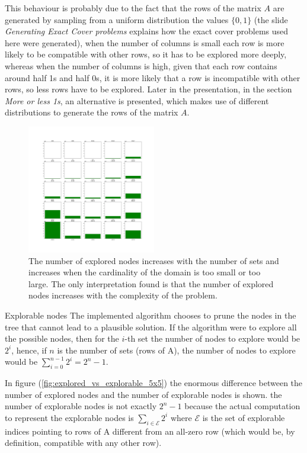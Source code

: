 \documentclass{beamer}
\begin{document}
\begin{frame}{}    
    This behaviour is probably due to the fact that the rows
    of the matrix $A$ are generated by sampling from a uniform distribution the values 
    $\{0, 1\}$ (the slide \textit{Generating Exact Cover problems} explains how 
    the exact cover problems used here were generated), when the number of columns is small each row is more likely to be 
    compatible with other rows, so it has to be explored more deeply, whereas when the 
    number of columns is high, given that each row contains around half 1s and half 0s,
    it is more likely that a row is incompatible with other rows, so less rows have to be 
    explored.
    Later in the presentation, in the section \textit{More or less 1s}, an alternative is presented,
    which makes use of different distributions to generate the rows of the matrix $A$.
\end{frame}

\begin{frame}
    \begin{figure}
        \centering
        \includegraphics[width=0.5\textwidth]{explored_5x5.pdf}
        \caption{The number of explored nodes increases with the number of sets and increases
        when the cardinality of the domain is too small or too large. The only interpretation
        found is that the number of explored nodes increases with the complexity of the problem.}
        \label{fig:explored_5x5}
    \end{figure}
\end{frame}

\begin{frame}{Explorable nodes}
    The implemented algorithm chooses to prune the nodes in the tree
    that cannot lead to a plausible solution.
    If the algorithm were to explore all the possible nodes, then for the 
    $i$-th set the number of nodes to explore would be $2^i$,
    hence, if $n$ is the number of sets (rows of A),
    the number of nodes to explore would be $\sum_{i=0}^{n-1} 2^i = 2^n - 1$.

    In figure (\ref{fig:explored_vs_explorable_5x5}) the enormous difference
    between the number of explored nodes and the number of explorable nodes is shown.
    the number of explorable nodes is not exactly $2^n - 1$ because
    the actual computation to represent the explorable nodes is 
    $\sum_{i\in\mathcal{E}}2^i$ where $\mathcal{E}$ is the set of
    explorable  indices
    pointing to rows of A different from an all-zero row (which would be,
    by definition, compatible with any other row).
\end{frame}
\end{document}
